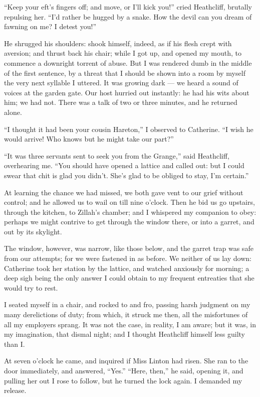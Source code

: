 \par “Keep your eft's fingers off; and move, or I'll kick you!” cried Heathcliff, brutally repulsing her. “I'd rather be hugged by a snake. How the devil can you dream of fawning on me? I detest you!”
\par He shrugged his shoulders: shook himself, indeed, as if his flesh crept with aversion; and thrust back his chair; while I got up, and opened my mouth, to commence a downright torrent of abuse. But I was rendered dumb in the middle of the first sentence, by a threat that I should be shown into a room by myself the very next syllable I uttered. It was growing dark — we heard a sound of voices at the garden gate. Our host hurried out instantly: he had his wits about him; we had not. There was a talk of two or three minutes, and he returned alone.
\par “I thought it had been your cousin Hareton,” I observed to Catherine. “I wish he would arrive! Who knows but he might take our part?”
\par “It was three servants sent to seek you from the Grange,” said Heathcliff, overhearing me. “You should have opened a lattice and called out: but I could swear that chit is glad you didn't. She's glad to be obliged to stay, I'm certain.”
\par At learning the chance we had missed, we both gave vent to our grief without control; and he allowed us to wail on till nine o'clock. Then he bid us go upstairs, through the kitchen, to Zillah's chamber; and I whispered my companion to obey: perhaps we might contrive to get through the window there, or into a garret, and out by its skylight.
\par The window, however, was narrow, like those below, and the garret trap was safe from our attempts; for we were fastened in as before. We neither of us lay down: Catherine took her station by the lattice, and watched anxiously for morning; a deep sigh being the only answer I could obtain to my frequent entreaties that she would try to rest.
\par I seated myself in a chair, and rocked to and fro, passing harsh judgment on my many derelictions of duty; from which, it struck me then, all the misfortunes of all my employers sprang. It was not the case, in reality, I am aware; but it was, in my imagination, that dismal night; and I thought Heathcliff himself less guilty than I.
\par At seven o'clock he came, and inquired if Miss Linton had risen. She ran to the door immediately, and answered, “Yes.” “Here, then,” he said, opening it, and pulling her out I rose to follow, but he turned the lock again. I demanded my release.
